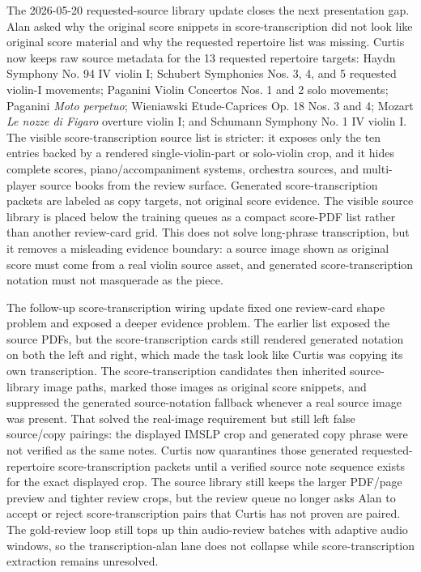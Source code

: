 The 2026-05-20 requested-source library update closes the next presentation gap. Alan asked why the original score snippets in score-transcription did not look like original score material and why the requested repertoire list was missing. Curtis now keeps raw source metadata for the 13 requested repertoire targets: Haydn Symphony No. 94 IV violin I; Schubert Symphonies Nos. 3, 4, and 5 requested violin-I movements; Paganini Violin Concertos Nos. 1 and 2 solo movements; Paganini \emph{Moto perpetuo}; Wieniawski Etude-Caprices Op. 18 Nos. 3 and 4; Mozart \emph{Le nozze di Figaro} overture violin I; and Schumann Symphony No. 1 IV violin I. The visible score-transcription source list is stricter: it exposes only the ten entries backed by a rendered single-violin-part or solo-violin crop, and it hides complete scores, piano/accompaniment systems, orchestra sources, and multi-player source books from the review surface. Generated score-transcription packets are labeled as copy targets, not original score evidence. The visible source library is placed below the training queues as a compact score-PDF list rather than another review-card grid. This does not solve long-phrase transcription, but it removes a misleading evidence boundary: a source image shown as original score must come from a real violin source asset, and generated score-transcription notation must not masquerade as the piece.

The follow-up score-transcription wiring update fixed one review-card shape problem and exposed a deeper evidence problem. The earlier list exposed the source PDFs, but the score-transcription cards still rendered generated notation on both the left and right, which made the task look like Curtis was copying its own transcription. The score-transcription candidates then inherited source-library image paths, marked those images as original score snippets, and suppressed the generated source-notation fallback whenever a real source image was present. That solved the real-image requirement but still left false source/copy pairings: the displayed IMSLP crop and generated copy phrase were not verified as the same notes. Curtis now quarantines those generated requested-repertoire score-transcription packets until a verified source note sequence exists for the exact displayed crop. The source library still keeps the larger PDF/page preview and tighter review crops, but the review queue no longer asks Alan to accept or reject score-transcription pairs that Curtis has not proven are paired. The gold-review loop still tops up thin audio-review batches with adaptive audio windows, so the transcription-alan lane does not collapse while score-transcription extraction remains unresolved.


